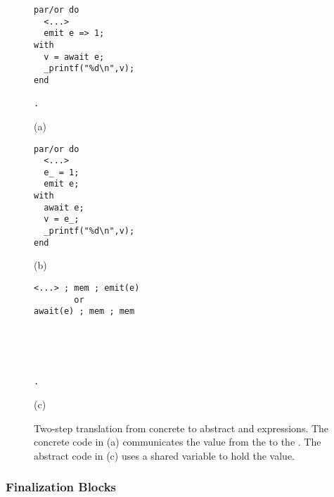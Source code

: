 \begin{figure}[t]
\begin{minipage}[t]{0.32\linewidth}
\begin{lstlisting}
par/or do
  <...>
  emit e => 1;
with
  v = await e;
  _printf("%d\n",v);
end

.
\end{lstlisting}
\centering\small{(a)}
\end{minipage}
%
\begin{minipage}[t]{0.32\linewidth}
\begin{lstlisting}
par/or do
  <...>
  e_ = 1;
  emit e;
with
  await e;
  v = e_;
  _printf("%d\n",v);
end
\end{lstlisting}
\centering\small{(b)}
\end{minipage}
%
\begin{minipage}[t]{0.32\linewidth}
\begin{lstlisting}
<...> ; mem ; emit(e)
        or
await(e) ; mem ; mem





.
\end{lstlisting}
\centering\small{(c)}
\end{minipage}
\caption{
Two-step translation from concrete to abstract  and  
expressions.
The concrete code in (a) communicates the value  from the  
to the .
The abstract code in (c) uses a shared variable to hold the value.
\label{lst.map.emit.await}
}
\end{figure}

\subsubsection{Finalization Blocks}
\label{sec.formal.fins}

